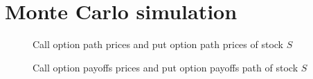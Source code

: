 \documentclass{beamer}
\begin{document}
\section{Monte Carlo simulation}

\begin{frame}
    \begin{figure}[ht!]
        \centering
    
        \caption{Call option path prices 
                and put option path prices of stock $S$}
     \label{fig:option_prices}
     \end{figure}
\end{frame}

\begin{frame}
    \begin{figure}[ht!]
        \centering
    
        \caption{Call option payoffs prices 
                and put option payoffs path of stock $S$}
     \label{fig:option_payoff}
     \end{figure}
\end{frame}
\end{document}
